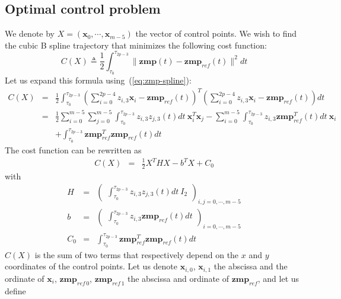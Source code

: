\documentclass {article}
\newcommand\x{\mathbf{x}}
\newcommand\z{z}
\newcommand\zmp{\mathbf{zmp}}
\newcommand\zmpref{\mathbf{zmp}_{ref}}
\newcommand\zmprefx{\mathbf{zmp}_{ref\,0}}
\newcommand\zmprefy{\mathbf{zmp}_{ref\,1}}
\begin{document}
\subsection {Optimal control problem}

We denote by $X=(\x_0, \cdots, \x_{m-5})$ the vector of control points.
We wish to find the cubic B spline trajectory that minimizes the
following cost function:
\begin{equation}\label{eq:qudratic-cost}
C(X) \triangleq \frac{1}{2}\int_{\tau_0}^{\tau_{2p-3}} \|\zmp (t) - \zmpref (t)\|^2 dt
\end{equation}
Let us expand this formula using~(\ref{eq:zmp-spline}):
\begin{eqnarray*}
C(X) &=& \frac{1}{2}\int_{\tau_0}^{\tau_{2p-3}} (\sum_{i=0}^{2p-4} \z_{i,3} \x_{i} - \zmpref (t))^T(\sum_{i=0}^{2p-4} \z_{i,3} \x_{i} - \zmpref (t)) dt\\
&=& \frac{1}{2}\sum_{i=0}^{m-5}\sum_{j=0}^{m-5}\int_{\tau_0}^{\tau_{2p-3}} \z_{i,3} \z_{j,3} (t) dt\  \x_i^T\x_j - \sum_{i=0}^{m-5}\int_{\tau_0}^{\tau_{2p-3}}\z_{i,3}\zmpref^T(t)dt\ \x_i\\
&&+ \int_{\tau_0}^{\tau_{2p-3}} \zmpref^T\zmpref (t)dt
\end{eqnarray*}
The cost function can be rewritten as
\begin{eqnarray*}
C(X) &=& \frac{1}{2}X^THX - b^T X + C_0
\end{eqnarray*}
with
\begin{eqnarray*}
H &=& \left(\begin{array}{c}
\int_{\tau_0}^{\tau_{2p-3}} \z_{i,3} \z_{j,3}(t)dt\ I_2 \end{array}\right)_{i,j=0,\cdots,m-5} \\
b &=& \left(\begin{array}{c}\int_{\tau_0}^{\tau_{2p-3}}\z_{i,3}\zmpref(t)dt\end{array}\right)_{i=0,\cdots,m-5}\\
C_0 &=&\int_{\tau_0}^{\tau_{2p-3}} \zmpref^T\zmpref (t)dt
\end{eqnarray*}
$C(X)$ is the sum of two terms that respectively depend on the $x$ and $y$
coordinates of the control points. Let us denote $\x_{i,0}$, $\x_{i,1}$ the abscissa and the ordinate of $\x_i$, $\zmprefx$, $\zmprefy$ the abscissa and ordinate of $\zmpref$, and let us define
\end{document}
